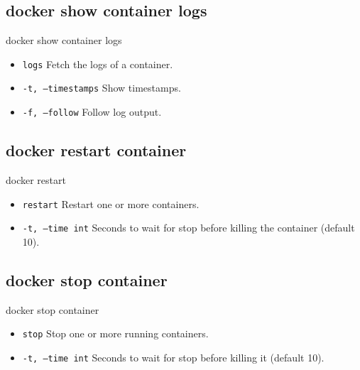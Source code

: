 \subsection{docker show container logs}\label{subsec:docker-show-container-logs}
\begin{frame}{docker show container logs}
    \begin{itemize}
        \item \texttt{logs} Fetch the logs of a container.
        \pause
        \item \texttt{-t, --timestamps} Show timestamps.
        \pause
        \item \texttt{-f, --follow} Follow log output.
        \pause
        
    \end{itemize}
\end{frame}

\subsection{docker restart container}\label{subsec:docker-restart-container}
\begin{frame}{docker restart}
    \begin{itemize}
        \item \texttt{restart} Restart one or more containers.
        \pause
        \item \texttt{-t, --time int} Seconds to wait for stop before killing the container (default 10).
        \pause
        
    \end{itemize}
\end{frame}

\subsection{docker stop container}\label{subsec:docker-stop-container}
\begin{frame}{docker stop container}
    \begin{itemize}
        \item \texttt{stop} Stop one or more running containers.
        \pause
        \item \texttt{-t, --time int} Seconds to wait for stop before killing it (default 10).
        \pause
        
    \end{itemize}
\end{frame}

